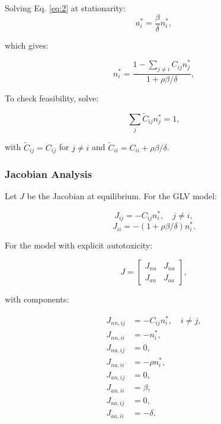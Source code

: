 \documentclass[11pt,a4paper,fleqn]{article}
\begin{document}
Solving Eq. \eqref{eq:2} at stationarity:
\begin{equation}
a_i^* = \frac{\beta}{\delta} n_i^*, \label{eq:6}
\end{equation}

which gives:

\begin{equation}
n_i^* = \frac{1 - \sum_{j \ne i} C_{ij} n_j^*}{1 + \rho \beta / \delta}, 
\label{eq:7}
\end{equation}

To check feasibility, solve:

\begin{equation}
\sum_j \tilde{C}_{ij} n_j^* = 1, 
\label{eq:8}
\end{equation}

with $\tilde{C}_{ij} = C_{ij}$ for $j \ne i$ and $\tilde{C}_{ii} = C_{ii} + \rho \beta / \delta$.

\subsubsection{Jacobian Analysis}

Let $J$ be the Jacobian at equilibrium. For the GLV model:

\begin{equation}
J_{ij} = -C_{ij} n_i^*, \quad j \ne i,
\end{equation}
\begin{equation}
J_{ii} = -(1 + \rho \beta / \delta) n_i^*.
\end{equation}

For the model with explicit autotoxicity:

\[
J = 
\begin{bmatrix}
J_{nn} & J_{na} \\
J_{an} & J_{aa}
\end{bmatrix},
\]

with components:

\begin{align}
J_{nn, ij} &= -C_{ij} n_i^*, \quad i \ne j, \\
J_{nn, ii} &= -n_i^*, \\
J_{na, ij} &= 0, \\
J_{na, ii} &= -\rho n_i^*, \\
J_{an, ij} &= 0, \\
J_{an, ii} &= \beta, \\
J_{aa, ij} &= 0, \\
J_{aa, ii} &= -\delta.
\end{align}
\end{document}

